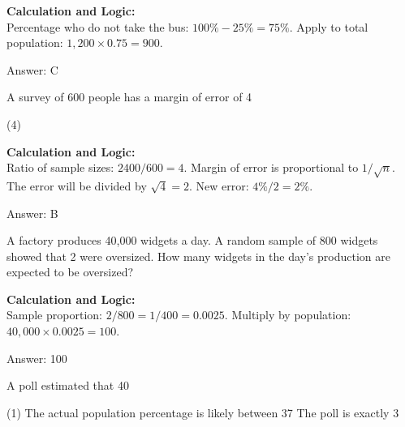 \documentclass[11pt,paper=a4,answers]{exam}
\begin{document}
\begin{questions}
\begin{solution}
\textbf{Calculation and Logic:} \\
Percentage who do not take the bus: $100\% - 25\% = 75\%$. Apply to total population: $1,200 \times 0.75 = 900$.

\vspace{30pt}

Answer: \colorbox{yellow!100}{C}
\end{solution}

\vspace{60pt}

\question
A survey of 600 people has a margin of error of 4%
\begin{tasks}(4)
\end{tasks}

\begin{solution}
\textbf{Calculation and Logic:} \\
Ratio of sample sizes: $2400 / 600 = 4$. Margin of error is proportional to $1/\sqrt{n}$. The error will be divided by $\sqrt{4} = 2$. New error: $4\% / 2 = 2\%$.

\vspace{30pt}

Answer: \colorbox{yellow!100}{B}
\end{solution}

\vspace{60pt}

\question
A factory produces 40,000 widgets a day. A random sample of 800 widgets showed that 2 were oversized. How many widgets in the day's production are expected to be oversized?

\begin{solution}
\textbf{Calculation and Logic:} \\
Sample proportion: $2 / 800 = 1 / 400 = 0.0025$. Multiply by population: $40,000 \times 0.0025 = 100$.

\vspace{30pt}

Answer: \colorbox{yellow!100}{100}
\end{solution}

\vspace{60pt}

\question
A poll estimated that 40%
\begin{tasks}(1)
    \task The actual population percentage is likely between 37%
    \task The poll is exactly 3%
\end{tasks}


\end{questions}
\end{document}
